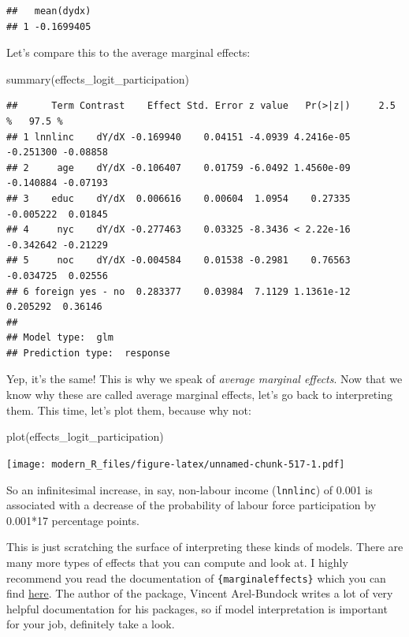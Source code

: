 \documentclass[
]{article}
\newenvironment{Shaded}{\begin{snugshade}}{\end{snugshade}}
\newcommand{\FunctionTok}[1]{\textcolor[rgb]{0.00,0.00,0.00}{#1}}
\newcommand{\NormalTok}[1]{#1}
\begin{document}
\begin{verbatim}
##   mean(dydx)
## 1 -0.1699405
\end{verbatim}

Let's compare this to the average marginal effects:

\begin{Shaded}
\begin{Highlighting}[]
\FunctionTok{summary}\NormalTok{(effects\_logit\_participation)}
\end{Highlighting}
\end{Shaded}

\begin{verbatim}
##      Term Contrast    Effect Std. Error z value   Pr(>|z|)     2.5 %   97.5 %
## 1 lnnlinc    dY/dX -0.169940    0.04151 -4.0939 4.2416e-05 -0.251300 -0.08858
## 2     age    dY/dX -0.106407    0.01759 -6.0492 1.4560e-09 -0.140884 -0.07193
## 3    educ    dY/dX  0.006616    0.00604  1.0954    0.27335 -0.005222  0.01845
## 4     nyc    dY/dX -0.277463    0.03325 -8.3436 < 2.22e-16 -0.342642 -0.21229
## 5     noc    dY/dX -0.004584    0.01538 -0.2981    0.76563 -0.034725  0.02556
## 6 foreign yes - no  0.283377    0.03984  7.1129 1.1361e-12  0.205292  0.36146
## 
## Model type:  glm 
## Prediction type:  response
\end{verbatim}

Yep, it's the same! This is why we speak of \emph{average marginal effects}. Now that we know why
these are called average marginal effects, let's go back to interpreting them. This time,
let's plot them, because why not:

\begin{Shaded}
\begin{Highlighting}[]
\FunctionTok{plot}\NormalTok{(effects\_logit\_participation)}
\end{Highlighting}
\end{Shaded}

\texttt{[image: modern\_R\_files/figure-latex/unnamed-chunk-517-1.pdf]}

So an infinitesimal increase, in say, non-labour income (\texttt{lnnlinc}) of 0.001 is associated with a
decrease of the probability of labour force participation by 0.001*17 percentage points.

This is just scratching the surface of interpreting these kinds of models. There are many more
types of effects that you can compute and look at. I highly recommend you read the documentation
of \texttt{\{marginaleffects\}} which you can find
\href{https://vincentarelbundock.github.io/marginaleffects/index.html}{here}. The author
of the package, Vincent Arel-Bundock writes a lot of very helpful documentation for his packages,
so if model interpretation is important for your job, definitely take a look.
\end{document}

